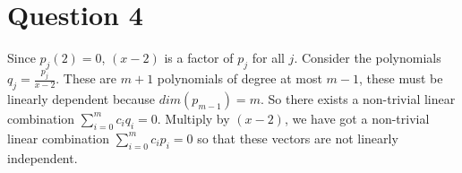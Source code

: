 \section*{Question 4}
Since $ p_j(2) = 0 $, $ (x-2) $ is a factor of $ p_j $ for all $ j $. Consider the polynomials $ q_j = \frac{p_j}{x-2} $. These are $ m + 1 $ polynomials of degree at most $ m - 1 $, these must be linearly dependent because $ dim(p_{m-1}) = m $. So there exists a non-trivial linear combination $ \sum\limits_{i=0}^{m} c_i q_i = 0 $. Multiply by $ (x - 2) $, we have got a non-trivial linear combination $ \sum\limits_{i=0}^{m} c_i p_i = 0 $ so that these vectors are not linearly independent.